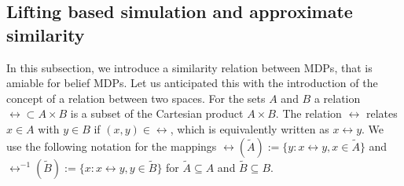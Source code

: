 \documentclass{ifacconf}
\renewcommand{\axx}[1]{{\color{orange} Ali: #1}}
\newcommand{\new}[1]{{\color{blue}#1}}
\begin{document}
\subsection{Lifting based simulation  and approximate similarity}
%
%
%
\new{In this subsection, we introduce a similarity relation between MDPs, that is amiable for belief MDPs. 
Let us anticipated this with the introduction of the concept of a relation between two spaces. }
For the sets $A$ and $B$ a relation $\rel\subset A\times B$ is a subset of the Cartesian product $A\times B$. The relation $\rel$ relates $x\in A$ with $y\in B$ if $(x,y)\in\rel$, which is equivalently written as $x\rel y$. 
We use the following notation for the mappings  $\rel(\widetilde A):=\{y: x\rel y, x\in \widetilde A\}$ and  $\rel^{-1}( \widetilde B):=\{x: x\rel y, y\in \widetilde B\}$ for $\widetilde A\subseteq A$ and $\widetilde B \subseteq B$.
\end{document}
